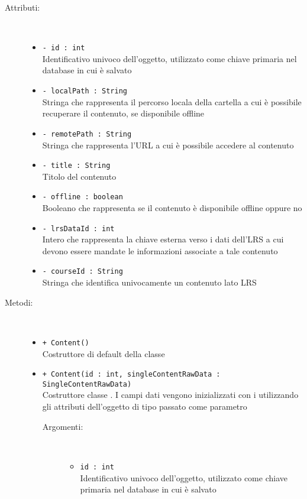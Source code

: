 \documentclass[../Tesi.tex]{subfiles}
\begin{document}
		\begin{description}
			\item[Attributi:] \
			\begin{itemize}
				\item \texttt{- id : int}\\
				Identificativo univoco dell'oggetto, utilizzato come chiave primaria nel database in cui è salvato

				\item \texttt{- localPath : String}\\
				Stringa che rappresenta il percorso locala della cartella a cui è possibile recuperare il contenuto, se disponibile offline

				\item \texttt{- remotePath : String}\\
				Stringa che rappresenta l'URL a cui è possibile accedere al contenuto

				\item \texttt{- title : String}\\
				Titolo del contenuto

				\item \texttt{- offline : boolean}\\
				Booleano che rappresenta se il contenuto è disponibile offline oppure no

				\item \texttt{- lrsDataId : int}\\
				Intero che rappresenta la chiave esterna verso i dati dell'LRS a cui devono essere mandate le informazioni associate a tale contenuto

				\item \texttt{- courseId : String}\\
				Stringa che identifica univocamente un contenuto lato LRS
			\end{itemize}

			\item[Metodi:] \
			\begin{itemize}
				\item \texttt{+ Content()}\\
				Costruttore di default della classe 

				\item \texttt{+ Content(id : int, singleContentRawData : \\SingleContentRawData)}\\
				Costruttore classe . I campi dati vengono inizializzati con i utilizzando gli attributi dell'oggetto di tipo  passato come parametro
				\begin{description}
					\item[Argomenti:] \
					\begin{itemize}
						\item \texttt{id : int}\\
						Identificativo univoco dell'oggetto, utilizzato come chiave primaria nel database in cui è salvato


\end{itemize}
\end{description}
\end{itemize}
\end{description}
\end{document}

